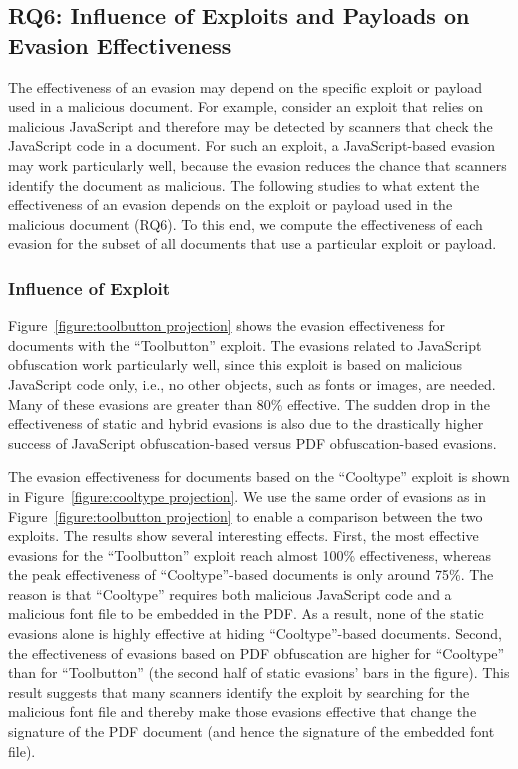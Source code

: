 \subsection{RQ6: Influence of Exploits and Payloads on Evasion Effectiveness}
\label{ss: influence of exploit effectiveness}

The effectiveness of an evasion may depend on the specific exploit or payload used in a malicious document.
For example, consider an exploit that relies on malicious JavaScript and therefore may be detected by scanners that check the JavaScript code in a document.
For such an exploit, a JavaScript-based evasion may work particularly well, because the evasion reduces the chance that scanners identify the document as malicious.
The following studies to what extent the effectiveness of an evasion depends on the exploit or payload used in the malicious document (RQ6).
To this end, we compute the effectiveness of each evasion for the subset of all documents that use a particular exploit or payload.

\subsubsection{Influence of Exploit}

Figure~\ref{figure:toolbutton projection} shows the evasion effectiveness for documents with the ``Toolbutton'' exploit.
The evasions related to JavaScript obfuscation work particularly well, 
since this exploit is based on malicious JavaScript code only, i.e., no other objects, such as fonts or images, are needed.
Many of these evasions are greater than 80\% effective.
The sudden drop in the effectiveness of static and hybrid evasions is also due to the drastically higher success of JavaScript obfuscation-based versus PDF obfuscation-based evasions.

The evasion effectiveness for documents based on the ``Cooltype'' exploit is shown in Figure~\ref{figure:cooltype projection}.
We use the same order of evasions as in Figure~\ref{figure:toolbutton projection} to enable a comparison between the two exploits.
The results show several interesting effects.
First, the most effective evasions for the ``Toolbutton'' exploit reach almost 100\% effectiveness, whereas the peak effectiveness of ``Cooltype''-based documents is only around 75\%.
The reason is that ``Cooltype'' requires both malicious JavaScript code and a malicious font file to be embedded in the PDF.
As a result, none of the static evasions alone is highly effective at hiding ``Cooltype''-based documents.
Second, the effectiveness of evasions based on PDF obfuscation are higher for ``Cooltype'' than for ``Toolbutton'' (the second half of static evasions' bars in the figure).
This result suggests that many scanners identify the exploit by searching for the
malicious font file and thereby make those evasions effective that change the signature of
the PDF document (and hence the signature of the embedded font file).


